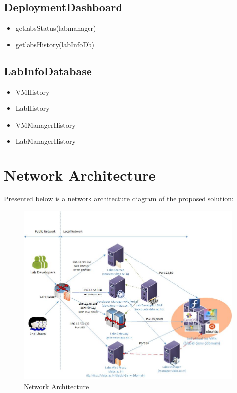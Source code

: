 \documentclass[11pt]{article}
\begin{document}
\subsection{DeploymentDashboard}
\label{sec-4.4}


\begin{itemize}
\item getlabsStatus(labmanager)
\item getlabsHistory(labInfoDb)
\end{itemize}
\subsection{LabInfoDatabase}
\label{sec-4.5}


\begin{itemize}
\item VMHistory
\item LabHistory
\item VMManagerHistory
\item LabManagerHistory
\end{itemize}
\section{Network Architecture}
\label{sec-5}

  Presented below is a network architecture diagram of the proposed
  solution:

   \begin{figure}[htb]
\centering
\includegraphics[width=16cm]{network-infrastructure.jpg}
\caption{Network Architecture}
\end{figure} 
\end{document}
